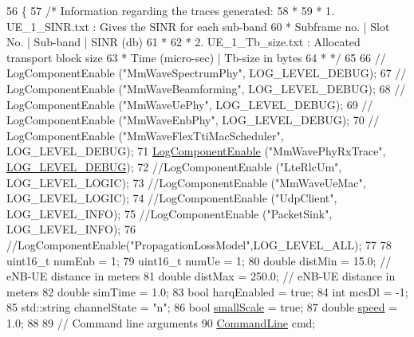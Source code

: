 \begin{DoxyCode}
56 \{
57   \textcolor{comment}{/* Information regarding the traces generated:}
58 \textcolor{comment}{   *}
59 \textcolor{comment}{   * 1. UE\_1\_SINR.txt : Gives the SINR for each sub-band}
60 \textcolor{comment}{   *    Subframe no.  | Slot No. | Sub-band  | SINR (db)}
61 \textcolor{comment}{   *}
62 \textcolor{comment}{   * 2. UE\_1\_Tb\_size.txt : Allocated transport block size}
63 \textcolor{comment}{   *    Time (micro-sec)  |  Tb-size in bytes}
64 \textcolor{comment}{   * */}
65 
66 \textcolor{comment}{//      LogComponentEnable ("MmWaveSpectrumPhy", LOG\_LEVEL\_DEBUG);}
67 \textcolor{comment}{//      LogComponentEnable ("MmWaveBeamforming", LOG\_LEVEL\_DEBUG);}
68 \textcolor{comment}{//      LogComponentEnable ("MmWaveUePhy", LOG\_LEVEL\_DEBUG);}
69 \textcolor{comment}{//      LogComponentEnable ("MmWaveEnbPhy", LOG\_LEVEL\_DEBUG);}
70 \textcolor{comment}{//      LogComponentEnable ("MmWaveFlexTtiMacScheduler", LOG\_LEVEL\_DEBUG);}
71         \hyperlink{namespacens3_adc4ef4f00bb2f5f4edae67fc3bc27f20}{LogComponentEnable} (\textcolor{stringliteral}{"MmWavePhyRxTrace"}, 
      \hyperlink{namespacens3_aa6464a4d69551a9cc968e17a65f39bdbabc85ae851e992c4d8577705c712061ef}{LOG\_LEVEL\_DEBUG});
72         \textcolor{comment}{//LogComponentEnable ("LteRlcUm", LOG\_LEVEL\_LOGIC);}
73         \textcolor{comment}{//LogComponentEnable ("MmWaveUeMac", LOG\_LEVEL\_LOGIC);}
74         \textcolor{comment}{//LogComponentEnable ("UdpClient", LOG\_LEVEL\_INFO);}
75         \textcolor{comment}{//LogComponentEnable ("PacketSink", LOG\_LEVEL\_INFO);}
76         \textcolor{comment}{//LogComponentEnable("PropagationLossModel",LOG\_LEVEL\_ALL);}
77 
78         uint16\_t numEnb = 1;
79         uint16\_t numUe = 1;
80         \textcolor{keywordtype}{double} distMin = 15.0;  \textcolor{comment}{// eNB-UE distance in meters}
81         \textcolor{keywordtype}{double} distMax = 250.0;  \textcolor{comment}{// eNB-UE distance in meters}
82         \textcolor{keywordtype}{double} simTime = 1.0;
83         \textcolor{keywordtype}{bool} harqEnabled = \textcolor{keyword}{true};
84         \textcolor{keywordtype}{int} mcsDl = -1;
85         std::string channelState = \textcolor{stringliteral}{"n"};
86         \textcolor{keywordtype}{bool} \hyperlink{mmwave-amc-test_8cc_a204169f2af2a5f81da1189ea236307c8}{smallScale} = \textcolor{keyword}{true};
87         \textcolor{keywordtype}{double} \hyperlink{mmwave-amc-test_8cc_a6dc6e6f3c75c509ce943163afb5dade7}{speed} = 1.0;
88 
89         \textcolor{comment}{// Command line arguments}
90         \hyperlink{classns3_1_1CommandLine}{CommandLine} cmd;

\end{DoxyCode}
